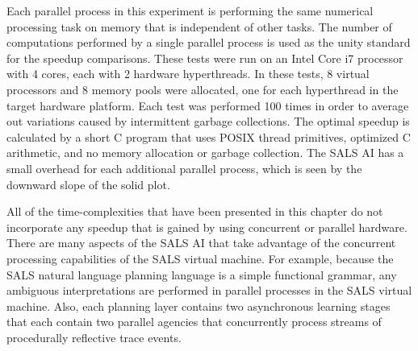 Each parallel process in this experiment is performing the same
numerical processing task on memory that is independent of other
tasks.  The number of computations performed by a single parallel
process is used as the unity standard for the speedup comparisons.
These tests were run on an Intel Core i7 processor with 4 cores, each
with 2 hardware hyperthreads.  In these tests, 8 virtual processors
and 8 memory pools were allocated, one for each hyperthread in the
target hardware platform.  Each test was performed 100 times in order
to average out variations caused by intermittent garbage collections.
The optimal speedup is calculated by a short C program that uses POSIX
thread primitives, optimized C arithmetic, and no memory allocation or
garbage collection.  The SALS AI has a small overhead for each
additional parallel process, which is seen by the downward slope of
the solid plot.

All of the time-complexities that have been presented in this chapter
do not incorporate any speedup that is gained by using concurrent or
parallel hardware.  There are many aspects of the SALS AI that take
advantage of the concurrent processing capabilities of the SALS
virtual machine.  For example, because the SALS natural language
planning language is a simple functional grammar, any ambiguous
interpretations are performed in parallel processes in the SALS
virtual machine.  Also, each planning layer contains two asynchronous
learning stages that each contain two parallel agencies that
concurrently process streams of procedurally reflective trace events.



